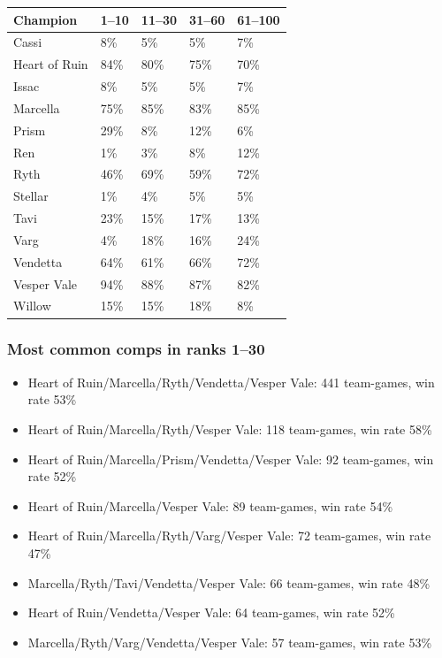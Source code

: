 \documentclass[
  10pt,
]{article}
\newcounter{none} %
\providecommand{\tightlist}{%
  \setlength{\itemsep}{0pt}\setlength{\parskip}{0pt}}
\begin{document}
{\def\LTcaptype{none} %
\begin{longtable}[]{@{}lllll@{}}
\toprule\noalign{}
Champion & 1--10 & 11--30 & 31--60 & 61--100 \\
\midrule\noalign{}
\endhead
\bottomrule\noalign{}
\endlastfoot
Cassi & 8\% & 5\% & 5\% & 7\% \\
Heart of Ruin & 84\% & 80\% & 75\% & 70\% \\
Issac & 8\% & 5\% & 5\% & 7\% \\
Marcella & 75\% & 85\% & 83\% & 85\% \\
Prism & 29\% & 8\% & 12\% & 6\% \\
Ren & 1\% & 3\% & 8\% & 12\% \\
Ryth & 46\% & 69\% & 59\% & 72\% \\
Stellar & 1\% & 4\% & 5\% & 5\% \\
Tavi & 23\% & 15\% & 17\% & 13\% \\
Varg & 4\% & 18\% & 16\% & 24\% \\
Vendetta & 64\% & 61\% & 66\% & 72\% \\
Vesper Vale & 94\% & 88\% & 87\% & 82\% \\
Willow & 15\% & 15\% & 18\% & 8\% \\
\end{longtable}
}

\subsubsection{Most common comps in ranks
1--30}\label{most-common-comps-in-ranks-130-1}

\begin{itemize}
\tightlist
\item
  Heart of Ruin/Marcella/Ryth/Vendetta/Vesper Vale: 441 team-games, win
  rate 53\%
\item
  Heart of Ruin/Marcella/Ryth/Vesper Vale: 118 team-games, win rate 58\%
\item
  Heart of Ruin/Marcella/Prism/Vendetta/Vesper Vale: 92 team-games, win
  rate 52\%
\item
  Heart of Ruin/Marcella/Vesper Vale: 89 team-games, win rate 54\%
\item
  Heart of Ruin/Marcella/Ryth/Varg/Vesper Vale: 72 team-games, win rate
  47\%
\item
  Marcella/Ryth/Tavi/Vendetta/Vesper Vale: 66 team-games, win rate 48\%
\item
  Heart of Ruin/Vendetta/Vesper Vale: 64 team-games, win rate 52\%
\item
  Marcella/Ryth/Varg/Vendetta/Vesper Vale: 57 team-games, win rate 53\%
\end{itemize}
\end{document}
